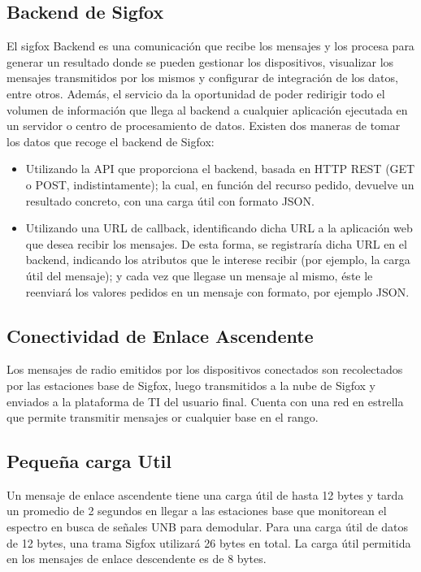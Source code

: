 \documentclass[12pt]{book}
\begin{document}
\subsection{Backend de Sigfox}
El sigfox Backend es una comunicación que recibe los mensajes y los procesa para generar un resultado donde se pueden gestionar los dispositivos, visualizar los mensajes transmitidos por los mismos y configurar de integración de los datos, entre otros. Además, el servicio da la oportunidad de poder redirigir todo el volumen de información que llega al backend a cualquier aplicación ejecutada en un servidor o centro de procesamiento de datos.
Existen dos maneras de tomar los datos que recoge el backend de Sigfox:
\begin{itemize}
	\item Utilizando la API que proporciona el backend, basada en HTTP REST (GET o POST, indistintamente); la cual, en función del recurso pedido, devuelve un resultado concreto, con una carga útil con formato JSON.
	\item Utilizando una URL de callback, identificando dicha URL a la aplicación web que desea recibir los mensajes. De esta forma, se registraría dicha URL en el backend, indicando los atributos que le interese recibir (por ejemplo, la carga útil del mensaje); y cada vez que llegase un mensaje al mismo, éste le reenviará los valores pedidos en un mensaje con formato, por ejemplo JSON.
\end{itemize}
\subsection{Conectividad de Enlace Ascendente}
Los mensajes de radio emitidos por los dispositivos conectados son recolectados por las estaciones base de Sigfox, luego transmitidos a la nube de Sigfox y enviados a la plataforma de TI del usuario final. Cuenta con una red en estrella que permite transmitir mensajes or cualquier base en el rango.

\subsection{Pequeña carga Util }
Un mensaje de enlace ascendente tiene una carga útil de hasta 12 bytes y tarda un promedio de 2 segundos en llegar a las estaciones base que monitorean el espectro en busca de señales UNB para demodular. Para una carga útil de datos de 12 bytes, una trama Sigfox utilizará 26 bytes en total. La carga útil permitida en los mensajes de enlace descendente es de 8 bytes.
\end{document}

